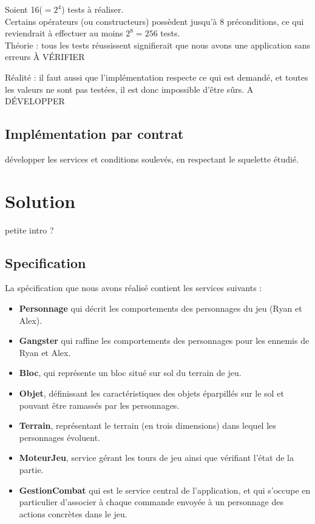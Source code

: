 \documentclass[a4paper, 11pt, notitlepage]{article}
\begin{document}
Soient 16($=2^4$) tests à réaliser.  \\

Certains opérateurs (ou constructeurs) possèdent jusqu'à 8 préconditions, ce qui reviendrait à effectuer au moins $2^8=256$ tests. \\


Théorie : tous les tests réussissent signifierait que nous avons une application sans erreurs À VÉRIFIER

Réalité : il faut aussi que l’implémentation respecte ce qui est
demandé, et toutes les valeurs ne sont pas testées, il est donc
impossible d'être sûrs. A DÉVELOPPER 


\subsection{Implémentation par contrat}
développer les services et conditions soulevés, en respectant le
squelette étudié.








\section{Solution}
petite intro ?

\subsection{Specification}

La spécification que nous avons réalisé contient les services suivants : 

\begin{itemize}
\item \textbf{Personnage} qui décrit les comportements des personnages du jeu (Ryan et Alex).
\item \textbf{Gangster} qui raffine les comportements des personnages pour les ennemis de Ryan et Alex.
\item \textbf{Bloc}, qui représente un bloc situé sur sol du terrain de jeu.
\item \textbf{Objet}, définissant les caractéristiques des objets éparpillés sur le sol et pouvant être ramassés par les personnages.
\item \textbf{Terrain}, représentant le terrain (en trois dimensions) dans lequel les personnages évoluent.
\item \textbf{MoteurJeu}, service gérant les tours de jeu ainsi que vérifiant l'état de la partie.
\item \textbf{GestionCombat} qui est le service central de l'application, et qui s'occupe en particulier d'associer à chaque commande envoyée à un personnage des actions concrètes dans le jeu. \\
\end{itemize}
\end{document}
